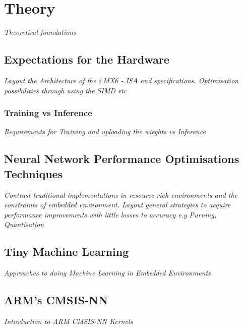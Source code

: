 \chapter{Theory}
\textit{Theoretical foundations}

\section{Expectations for the Hardware}
\textit{Layout the Architecture of the i.MX6 - ISA and specifications. Optimisation possibilities through using the SIMD etc}

\subsection{Training vs Inference}
\textit{Requirements for Training and uploading the wieghts vs Inference}

\section{Neural Network Performance Optimisations Techniques}
\textit{Contrast traditional implementations in resource rich environments and the constraints of embedded environment. Layout general strategies to acquire performance improvements with little losses to accuracy e.g Purning, Quantisation}

\section{Tiny Machine Learning}
\textit{Approaches to doing Machine Learning in Embedded Environments}

\section{ARM's CMSIS-NN}
\textit{Introduction to ARM CMSIS-NN Kernels}

